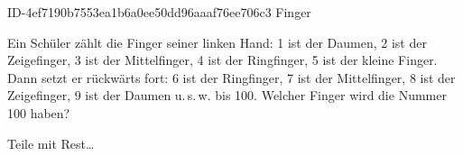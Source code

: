 \begin{exercise}
      {ID-4ef7190b7553ea1b6a0ee50dd96aaaf76ee706c3}
      {Finger}
  \ifproblem\problem\par
    Ein Schüler zählt die Finger seiner linken Hand:
    1 ist der Daumen,
    2 ist der Zeigefinger,
    3 ist der Mittelfinger,
    4 ist der Ringfinger,
    5 ist der kleine Finger.
    Dann setzt er rückwärts fort:
    6 ist der Ringfinger,
    7 ist der Mittelfinger,
    8 ist der Zeigefinger,
    9 ist der Daumen u.\,s.\,w. bis 100.
    Welcher Finger wird die Nummer 100 haben?
  \fi
  \ifoutline\outline\par
    Teile mit Rest\ldots
  \fi
\end{exercise}
